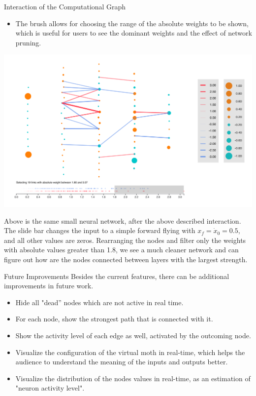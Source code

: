 \documentclass[final,hyperref={pdfpagelabels=false}]{beamer}
\begin{document}
\begin{frame}{}
\begin{columns}[t]
\begin{column}{.3\linewidth}
\begin{block}{Interaction of the Computational Graph}
\begin{itemize}
\item The brush allows for choosing the range of the absolute weights to be shown, which is useful for users to see the dominant weights and the effect of network pruning. 
\end{itemize}
\vspace{0cm}
      \begin{center}
                \includegraphics[scale=0.5]{NNinter.png}
      \end{center}
      \vspace{0cm}
Above is the same small neural network, after the above described interaction. The slide bar changes the input to a simple forward flying with $x_f = \dot{x}_0 = 0.5$, and all other values are zeros. Rearranging the nodes and filter only the weights with absolute values greater than 1.8, we see a much cleaner network and can figure out how are the nodes connected between layers with the largest strength.
\end{block}   

\begin{block}{Future Improvements}
Besides the current features, there can be additional improvements in future work.
\begin{itemize}
\item Hide all "dead'' nodes which are not active in real time.
\item For each node, show the strongest path that is connected with it.
\item Show the activity level of each edge as well, activated by the outcoming node. 
\item Visualize the configuration of the virtual moth in real-time, which helps the audience to understand the meaning of the inputs and outputs better. 
\item Visualize the distribution of the nodes values in real-time, as an estimation of "neuron activity level".
\end{itemize}
\bigskip
\bigskip
\end{block}   

      
      \end{column}

      
    \end{columns}
  \end{frame}
\end{document}
